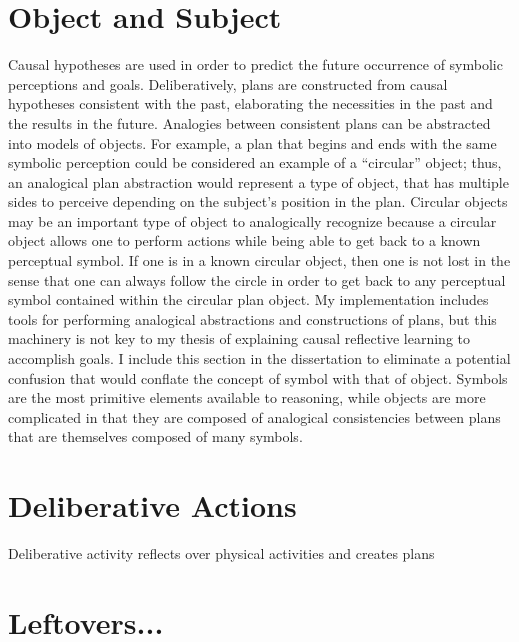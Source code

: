 \section{Object and Subject}

Causal hypotheses are used in order to predict the future occurrence
of symbolic perceptions and goals.  Deliberatively, plans are
constructed from causal hypotheses consistent with the past,
elaborating the necessities in the past and the results in the future.
Analogies between consistent plans can be abstracted into models of
objects.  For example, a plan that begins and ends with the same
symbolic perception could be considered an example of a ``circular''
object; thus, an analogical plan abstraction would represent a type of
object, that has multiple sides to perceive depending on the subject's
position in the plan.  Circular objects may be an important type of
object to analogically recognize because a circular object allows one
to perform actions while being able to get back to a known perceptual
symbol.  If one is in a known circular object, then one is not lost in
the sense that one can always follow the circle in order to get back
to any perceptual symbol contained within the circular plan object.
My implementation includes tools for performing analogical
abstractions and constructions of plans, but this machinery is not key
to my thesis of explaining causal reflective learning to accomplish
goals.  I include this section in the dissertation to eliminate a
potential confusion that would conflate the concept of symbol with
that of object.  Symbols are the most primitive elements available to
reasoning, while objects are more complicated in that they are
composed of analogical consistencies between plans that are themselves
composed of many symbols.

\section{Deliberative Actions}

Deliberative activity reflects over physical activities and creates
plans




\section{Leftovers...}



